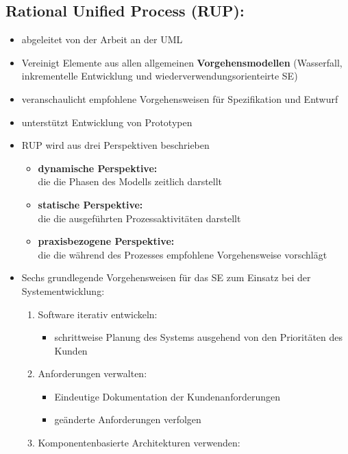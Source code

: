 \subsection{Rational Unified Process (RUP):}
\begin{itemize}
    \item abgeleitet von der Arbeit an der UML
    \item Vereinigt Elemente aus allen allgemeinen \textbf{Vorgehensmodellen} (Wasserfall, inkrementelle Entwicklung und wiederverwendungsorienteirte SE)
    \item veranschaulicht empfohlene Vorgehensweisen für Spezifikation und Entwurf
    \item unterstützt Entwicklung von Prototypen
    \item RUP wird aus drei Perspektiven beschrieben
    \begin{itemize}
        \item \textbf{dynamische Perspektive:}\\
        die die Phasen des Modells zeitlich darstellt
        \item \textbf{statische Perspektive:}\\
        die die ausgeführten Prozessaktivitäten darstellt
        \item \textbf{praxisbezogene Perspektive:}\\ die die während des Prozesses empfohlene Vorgehensweise vorschlägt
    \end{itemize}
    \item Sechs grundlegende Vorgehensweisen für das SE zum Einsatz bei der Systementwicklung:
    \begin{enumerate}
        \item Software iterativ entwickeln:
        \begin{itemize}
            \item schrittweise Planung des Systems ausgehend von den Prioritäten des Kunden 
        \end{itemize}
        \item Anforderungen verwalten:
        \begin{itemize}
            \item Eindeutige Dokumentation der Kundenanforderungen
            \item geänderte Anforderungen verfolgen
        \end{itemize}
        \item Komponentenbasierte Architekturen verwenden:
        \begin{itemize}

\end{itemize}
\end{enumerate}
\end{itemize}
